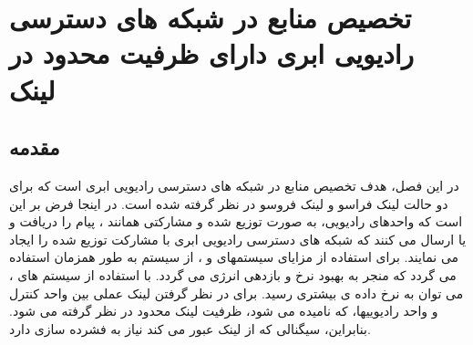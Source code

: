 \chapter{تخصیص منابع در شبکه های دسترسی رادیویی ابری دارای ظرفیت محدود در لینک }
\section{مقدمه}
در این فصل، هدف تخصیص منابع در شبکه های  دسترسی رادیویی ابری است که برای دو حالت لینک فراسو و لینک فروسو در نظر گرفته شده است. در اینجا فرض بر این است که واحدهای رادیویی، به صورت توزیع شده و مشارکتی همانند ، پیام را دریافت و یا ارسال می کنند که شبکه های دسترسی رادیویی ابری با مشارکت توزیع شده را ایجاد می نمایند.
برای استفاده از مزایای سیستمهای  و ، از سیستم  به طور همزمان استفاده می گردد که منجر به بهبود نرخ و بازدهی انرژی  می گردد. با استفاده از سیستم های ، می توان به نرخ داده ی بیشتری رسید.\newline
برای در نظر گرفتن لینک عملی بین واحد کنترل و واحد رادیوییها، که  نامیده می شود، ظرفیت لینک  محدود در نظر گرفته می شود. بنابراین، سیگنالی که از لینک  عبور می کند نیاز به فشرده سازی دارد.

